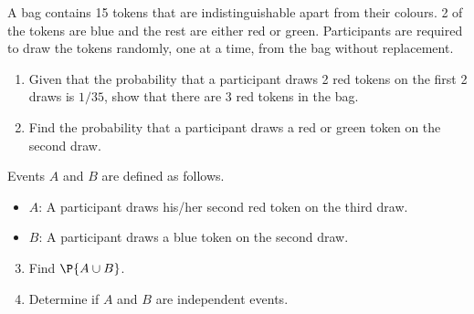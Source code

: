 \begin{problem}
    A bag contains 15 tokens that are indistinguishable apart from their colours. 2 of the tokens are blue and the rest are either red or green. Participants are required to draw the tokens randomly, one at a time, from the bag without replacement.

    \begin{enumerate}
        \item Given that the probability that a participant draws 2 red tokens on the first 2 draws is $1/35$, show that there are 3 red tokens in the bag.
        \item Find the probability that a participant draws a red or green token on the second draw.
    \end{enumerate}

    Events $A$ and $B$ are defined as follows.
    \begin{itemize}
        \item $A$: A participant draws his/her second red token on the third draw.
        \item $B$: A participant draws a blue token on the second draw.
    \end{itemize}

    \begin{enumerate}
        \setcounter{enumi}{2}
        \item Find $\P{A \cup B}$.
        \item Determine if $A$ and $B$ are independent events.
    \end{enumerate}
\end{problem}
